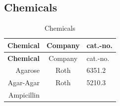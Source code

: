 \documentclass[11pt,singlespacinge,twoside]{reedthesis} %
\begin{document}
\hypertarget{mat-chem}{%
\subsection{Chemicals}\label{mat-chem}}
\begin{longtable}[]{@{}rcl@{}}
\caption{\label{tab:mat-chem} Chemicals}\tabularnewline
\toprule
\begin{minipage}[b]{0.26\columnwidth}\raggedleft
\textbf{Chemical}\strut
\end{minipage} & \begin{minipage}[b]{0.50\columnwidth}\centering
Company\strut
\end{minipage} & \begin{minipage}[b]{0.16\columnwidth}\raggedright
cat.-no.\strut
\end{minipage}\tabularnewline
\midrule
\endfirsthead
\toprule
\begin{minipage}[b]{0.26\columnwidth}\raggedleft
\textbf{Chemical}\strut
\end{minipage} & \begin{minipage}[b]{0.50\columnwidth}\centering
Company\strut
\end{minipage} & \begin{minipage}[b]{0.16\columnwidth}\raggedright
cat.-no.\strut
\end{minipage}\tabularnewline
\midrule
\endhead
\begin{minipage}[t]{0.26\columnwidth}\raggedleft
Agarose\strut
\end{minipage} & \begin{minipage}[t]{0.50\columnwidth}\centering
Roth\strut
\end{minipage} & \begin{minipage}[t]{0.16\columnwidth}\raggedright
6351.2\strut
\end{minipage}\tabularnewline
\begin{minipage}[t]{0.26\columnwidth}\raggedleft
Agar-Agar\strut
\end{minipage} & \begin{minipage}[t]{0.50\columnwidth}\centering
Roth\strut
\end{minipage} & \begin{minipage}[t]{0.16\columnwidth}\raggedright
5210.3\strut
\end{minipage}\tabularnewline
\begin{minipage}[t]{0.26\columnwidth}\raggedleft
Ampicillin\strut
\end{minipage} & \begin{minipage}[t]{0.50\columnwidth}\centering

\end{minipage}
\end{longtable}
\end{document}
